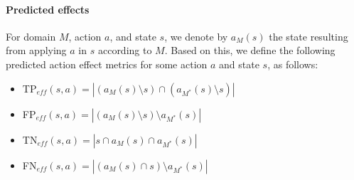 \documentclass{article}
\theoremstyle{definition}
\theoremstyle{remark}
\newcommand{\realm}{{\ensuremath{M^*}}\xspace}
\newcommand{\eff}{\ensuremath{\textit{eff}}\xspace}
\newif\ifaddcomments
\newcommand{\roni}[1]{\ifaddcomments{\textcolor{red}{[Roni: #1]}}\fi}
\newcommand{\yarin}[1]{\ifaddcomments{\textcolor{teal}{[Yarin: #1]}}\fi}
\newcommand{\gregor}[1]{\ifaddcomments{\textcolor{orange}{[Gregor: #1]}}\fi}
\newcommand{\cm}[1]{\ifaddcomments{\textcolor{olive}{[Christian: #1]}}\fi}
\newcommand{\leo}[1]{\ifaddcomments{\textcolor{pink}{[Leonardo: #1]}}\fi}
\begin{document}
\paragraph{Predicted effects}
For domain $M$, action $a$, and state $s$, we denote by $a_M(s)$ the state resulting from applying $a$ in $s$ according to $M$. 
Based on this, we define the following predicted action effect metrics for some action $a$ and state $s$, as follows: 
\begin{itemize}
    \item TP$_{\eff}(s,a)=|(a_M(s)\setminus s)\cap (a_\realm(s)\setminus s)|$
    \item FP$_{\eff}(s,a)=|(a_M(s)\setminus s)\setminus a_\realm(s)|$ 
    \item TN$_{\eff}(s,a)=|s \cap a_M(s) \cap a_\realm(s)|$
    \item FN$_{\eff}(s,a)=|(a_M(s)\cap s)\setminus a_\realm(s)|$ \gregor{there is a start too many (this is always $\emptyset$) I assume it should be $(a_M(s)\cap s)\setminus (a_\realm(s) \cap s)$ -- the facts that are not changed by $a_M$, but not counting the ones changes by $M_\realm$}\cm{The TN and FN aren't looking correct...but after spending some minutes with it, I think it is ;). Should state that a "negative" here indicates a literal that remains unchanged.}
    \leo{should we denote $a_M(s)$ as `$s'$ obtained after executing $a$ in $s$`? I'm not sure currently is formally correct since we used $a$ to denote actions in the previous paragraph.}
\end{itemize}


\roni{Aggregate only over action applicable according to both 
Rationale: if a model specifies an action does not applicable thne its effects are not defined.
TODO: Add a discussion about this}
\end{document}
